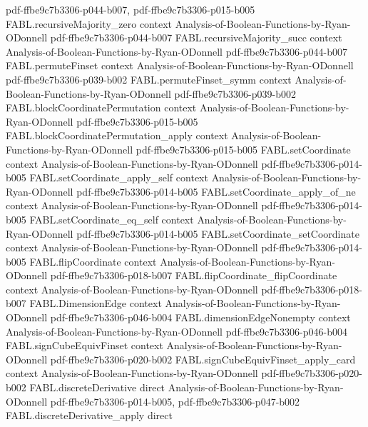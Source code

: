 \begin{theorem}
  {pdf-ffbe9c7b3306-p044-b007,
    pdf-ffbe9c7b3306-p015-b005}
\proofstep
  {FABL.recursiveMajority_zero}
  {context}
  {Analysis-of-Boolean-Functions-by-Ryan-ODonnell}
  {pdf-ffbe9c7b3306-p044-b007}
\proofstep
  {FABL.recursiveMajority_succ}
  {context}
  {Analysis-of-Boolean-Functions-by-Ryan-ODonnell}
  {pdf-ffbe9c7b3306-p044-b007}
\proofstep
  {FABL.permuteFinset}
  {context}
  {Analysis-of-Boolean-Functions-by-Ryan-ODonnell}
  {pdf-ffbe9c7b3306-p039-b002}
\proofstep
  {FABL.permuteFinset_symm}
  {context}
  {Analysis-of-Boolean-Functions-by-Ryan-ODonnell}
  {pdf-ffbe9c7b3306-p039-b002}
\proofstep
  {FABL.blockCoordinatePermutation}
  {context}
  {Analysis-of-Boolean-Functions-by-Ryan-ODonnell}
  {pdf-ffbe9c7b3306-p015-b005}
\proofstep
  {FABL.blockCoordinatePermutation_apply}
  {context}
  {Analysis-of-Boolean-Functions-by-Ryan-ODonnell}
  {pdf-ffbe9c7b3306-p015-b005}
\proofstep
  {FABL.setCoordinate}
  {context}
  {Analysis-of-Boolean-Functions-by-Ryan-ODonnell}
  {pdf-ffbe9c7b3306-p014-b005}
\proofstep
  {FABL.setCoordinate_apply_self}
  {context}
  {Analysis-of-Boolean-Functions-by-Ryan-ODonnell}
  {pdf-ffbe9c7b3306-p014-b005}
\proofstep
  {FABL.setCoordinate_apply_of_ne}
  {context}
  {Analysis-of-Boolean-Functions-by-Ryan-ODonnell}
  {pdf-ffbe9c7b3306-p014-b005}
\proofstep
  {FABL.setCoordinate_eq_self}
  {context}
  {Analysis-of-Boolean-Functions-by-Ryan-ODonnell}
  {pdf-ffbe9c7b3306-p014-b005}
\proofstep
  {FABL.setCoordinate_setCoordinate}
  {context}
  {Analysis-of-Boolean-Functions-by-Ryan-ODonnell}
  {pdf-ffbe9c7b3306-p014-b005}
\proofstep
  {FABL.flipCoordinate}
  {context}
  {Analysis-of-Boolean-Functions-by-Ryan-ODonnell}
  {pdf-ffbe9c7b3306-p018-b007}
\proofstep
  {FABL.flipCoordinate_flipCoordinate}
  {context}
  {Analysis-of-Boolean-Functions-by-Ryan-ODonnell}
  {pdf-ffbe9c7b3306-p018-b007}
\proofstep
  {FABL.DimensionEdge}
  {context}
  {Analysis-of-Boolean-Functions-by-Ryan-ODonnell}
  {pdf-ffbe9c7b3306-p046-b004}
\proofstep
  {FABL.dimensionEdgeNonempty}
  {context}
  {Analysis-of-Boolean-Functions-by-Ryan-ODonnell}
  {pdf-ffbe9c7b3306-p046-b004}
\proofstep
  {FABL.signCubeEquivFinset}
  {context}
  {Analysis-of-Boolean-Functions-by-Ryan-ODonnell}
  {pdf-ffbe9c7b3306-p020-b002}
\proofstep
  {FABL.signCubeEquivFinset_apply_card}
  {context}
  {Analysis-of-Boolean-Functions-by-Ryan-ODonnell}
  {pdf-ffbe9c7b3306-p020-b002}
\proofstep
  {FABL.discreteDerivative}
  {direct}
  {Analysis-of-Boolean-Functions-by-Ryan-ODonnell}
  {pdf-ffbe9c7b3306-p014-b005,
    pdf-ffbe9c7b3306-p047-b002}
\proofstep
  {FABL.discreteDerivative_apply}
  {direct}

\end{theorem}
